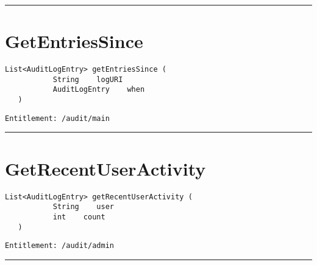\rule{12cm}{2pt}
\section{GetEntriesSince}
\label{Api:GetEntriesSince}
\begin{lstlisting}[style=nonumbers]
   List<AuditLogEntry> getEntriesSince (
           String    logURI
           AuditLogEntry    when
   )
\end{lstlisting}
\begin{Verbatim}[formatcom=\color{Maroon}]
  Entitlement: /audit/main
\end{Verbatim}



\rule{12cm}{2pt}
\section{GetRecentUserActivity}
\label{Api:GetRecentUserActivity}
\begin{lstlisting}[style=nonumbers]
   List<AuditLogEntry> getRecentUserActivity (
           String    user
           int    count
   )
\end{lstlisting}
\begin{Verbatim}[formatcom=\color{Maroon}]
  Entitlement: /audit/admin
\end{Verbatim}



\rule{12cm}{2pt}
